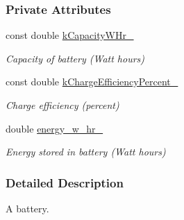 \subsubsection*{Private Attributes}
\begin{DoxyCompactItemize}
\item 
\mbox{\label{classosse_1_1collaborate_1_1_battery_a66a6e5481749e19f7d0ffc48f57fd93d}} 
const double \hyperlink{classosse_1_1collaborate_1_1_battery_a66a6e5481749e19f7d0ffc48f57fd93d}{k\+Capacity\+W\+Hr\+\_\+}
\begin{DoxyCompactList}\small\item\em Capacity of battery (Watt hours) \end{DoxyCompactList}\item 
\mbox{\label{classosse_1_1collaborate_1_1_battery_a3d18940f0a60fc606e590f718eff1248}} 
const double \hyperlink{classosse_1_1collaborate_1_1_battery_a3d18940f0a60fc606e590f718eff1248}{k\+Charge\+Efficiency\+Percent\+\_\+}
\begin{DoxyCompactList}\small\item\em Charge efficiency (percent) \end{DoxyCompactList}\item 
\mbox{\label{classosse_1_1collaborate_1_1_battery_a8e45c42076a5adfbb55122872bc28bcc}} 
double \hyperlink{classosse_1_1collaborate_1_1_battery_a8e45c42076a5adfbb55122872bc28bcc}{energy\+\_\+w\+\_\+hr\+\_\+}
\begin{DoxyCompactList}\small\item\em Energy stored in battery (Watt hours) \end{DoxyCompactList}\end{DoxyCompactItemize}


\subsubsection{Detailed Description}
A battery. 

